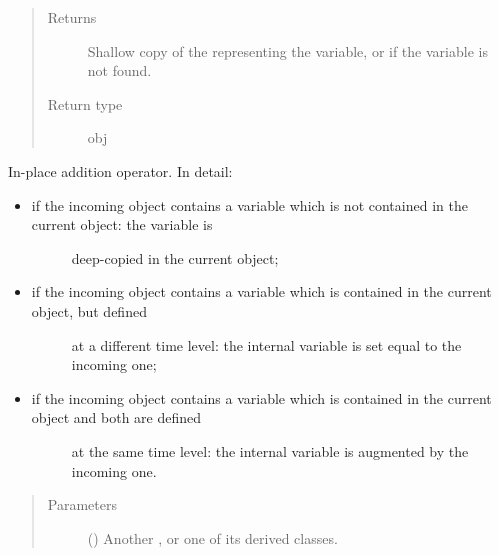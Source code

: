 \documentclass[letterpaper,10pt,english]{sphinxmanual}
\begin{document}
\begin{fulllineitems}
\begin{fulllineitems}
\begin{quote}
\begin{description}
\item[{Returns}] \leavevmode
Shallow copy of the  representing the variable, or  if the variable is not found.

\item[{Return type}] \leavevmode
obj

\end{description}\end{quote}

\end{fulllineitems}


\begin{fulllineitems}
\label{\detokenize{api:storages.grid_data.GridData.__iadd__}}
In-place addition operator. In detail:
\begin{itemize}
\item {} \begin{description}
\item[{if the incoming object contains a variable which is not contained in the current object: the variable is}] \leavevmode
deep-copied in the current object;

\end{description}

\item {} \begin{description}
\item[{if the incoming object contains a variable which is contained in the current object, but defined}] \leavevmode
at a different time level: the internal variable is set equal to the incoming one;

\end{description}

\item {} \begin{description}
\item[{if the incoming object contains a variable which is contained in the current object and both are defined}] \leavevmode
at the same time level: the internal variable is augmented by the incoming one.

\end{description}

\end{itemize}
\begin{quote}\begin{description}
\item[{Parameters}] \leavevmode
{} () \textendash{} Another , or one of its derived classes.


\end{description}
\end{quote}
\end{fulllineitems}
\end{fulllineitems}
\end{document}

